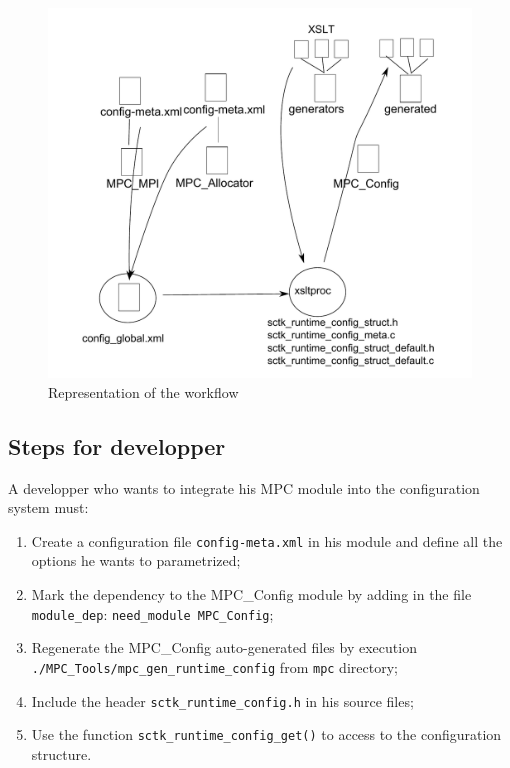 \documentclass{article}
\begin{document}
\begin{figure}[htc!]
\includegraphics[scale=0.8]{file-workflow.pdf}
\caption{Representation of the workflow}
\label{fig:conf_workflow_conf}
\end{figure}

\subsection {Steps for developper}

A developper who wants to integrate his MPC module into the configuration system must:
\begin{enumerate}
\item Create a configuration file \texttt{config-meta.xml} in his module and define all the options he wants to parametrized;
\item Mark the dependency to the MPC\_Config module by adding in the file \texttt{module\_dep}: \texttt{need\_module MPC\_Config};
\item Regenerate the MPC\_Config auto-generated files by execution \texttt{./MPC\_Tools/mpc\_gen\_runtime\_config} from \texttt{mpc} directory;
\item Include the header \texttt{sctk\_runtime\_config.h} in his source files;
\item Use the function \texttt{sctk\_runtime\_config\_get()} to access to the configuration structure.
\end{enumerate}
\end{document}
